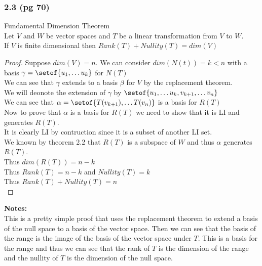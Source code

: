 \documentclass[answers,12pt,addpoints]{exam}
\begin{document}
\subsubsection{2.3 (pg 70)}
Fundamental Dimension Theorem\\
Let $V$ and $W$ be vector spaces and $T$ be a linear transformation from $V$ to $W$.\\
If $V$ is finite dimensional then $Rank(T) + Nullity(T) = dim(V)$\\
\begin{proof}
    Suppose $dim(V) = n$.
    We can consider $dim(N(t)) = k <n$ with a basis $ \gamma = \setof{u_1, \dots u_k}$ for $N(T)$\\
    We can see that $\gamma$ extends to a basis $\beta$ for $V$ by the replacement theorem.\\
    We will deonote the extension of $\gamma$ by $\setof{u_1, \dots u_k, v_{k+1}, \dots v_n}$\\
    We can see that $\alpha = \setof{T(v_{k+1}), \dots T(v_n)}$ is a basis for $R(T)$\\
    Now to prove that $\alpha$ is a basis for $R(T)$ we need to show that it is LI and generates $R(T)$.\\
    It is clearly LI by contruction since it is a subset of another LI set.\\
    We known by theorem 2.2 that $R(T)$ is a subspace of $W$ and thus $\alpha$ generates $R(T)$.\\
    Thus $dim(R(T)) = n-k$\\
    Thus $Rank(T) = n-k$ and $Nullity(T) = k$\\
    Thus $Rank(T) + Nullity(T) = n$\\
\end{proof} 
\textbf{Notes:}\\
This is a pretty simple proof that uses the replacement theorem to extend a basis of the null space to a basis of the vector space. Then we can see that the basis of the range is the image of the basis of the vector space under $T$. This is a basis for the range and thus we can see that the rank of $T$ is the dimension of the range and the nullity of $T$ is the dimension of the null space.\\
\end{document}
